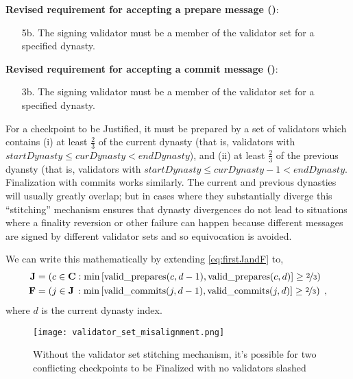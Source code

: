 \documentclass[12pt]{article}
\begin{document}

\textbf{Revised requirement for accepting a prepare message ()}:
\begin{enumerate}
\item[5b.] The signing validator must be a member of the validator set for a specified dynasty.
\end{enumerate}


\textbf{Revised requirement for accepting a commit message ()}:
\begin{enumerate}
\item[3b.] The signing validator must be a member of the validator set for a specified dynasty.
\end{enumerate}


For a checkpoint to be Justified, it must be prepared by a set of validators which contains (i) at least $\frac{2}{3}$ of the current dynasty (that is, validators with $startDynasty \leq curDynasty < endDynasty$), and (ii) at least $\frac{2}{3}$ of the previous dyansty (that is, validators with $startDynasty \leq curDynasty - 1 < endDynasty$. Finalization with commits works similarly. The current and previous dynasties will usually greatly overlap; but in cases where they substantially diverge this ``stitching'' mechanism ensures that dynasty divergences do not lead to situations where a finality reversion or other failure can happen because different messages are signed by different validator sets and so equivocation is avoided.

We can write this mathematically by extending \eqref{eq:firstJandF} to,
\begin{equation}
\begin{split}
    \mathbf{J} &= \left( c \in \mathbf{C} : \min\left[ \textnormal{valid\_prepares}(c,d-1), \textnormal{valid\_prepares}(c,d) \right] \geq \nicefrac{2}{3} \right) \\
    \mathbf{F} &= \left( j \in \mathbf{J} \,: \min\left[\textnormal{valid\_commits}(j,d-1), \textnormal{valid\_commits}(j,d) \right] \geq \nicefrac{2}{3} \right)\; ,
\end{split}
\label{eq:secondJandF}
\end{equation}
where $d$ is the current dynasty index.


\begin{figure}[h!tb]
\centering
\texttt{[image: validator\_set\_misalignment.png]}
\caption{Without the validator set stitching mechanism, it's possible for two conflicting checkpoints to be Finalized with no validators slashed}
\label{fig:dynamic2}
\end{figure}
\end{document}
